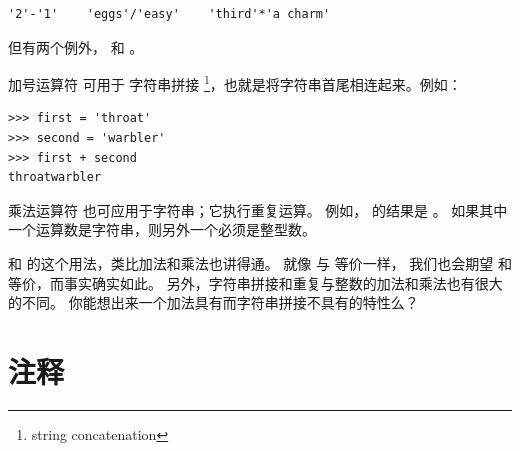 \begin{lstlisting}
'2'-'1'    'eggs'/'easy'    'third'*'a charm'
\end{lstlisting}

%

但有两个例外，\li{+} 和 \li{*}。

加号运算符 \li{+} 可用于 字符串拼接 \footnote{string concatenation}，也就是将字符串首尾相连起来。例如：

\begin{lstlisting}
>>> first = 'throat'
>>> second = 'warbler'
>>> first + second
throatwarbler
\end{lstlisting}

%

乘法运算符 \li{*} 也可应用于字符串；它执行重复运算。 例如， 的结果是 。  如果其中一个运算数是字符串，则另外一个必须是整型数。

\li{+} 和 \li{*} 的这个用法，类比加法和乘法也讲得通。 就像  与  等价一样， 我们也会期望  和  等价，而事实确实如此。 另外，字符串拼接和重复与整数的加法和乘法也有很大的不同。 你能想出来一个加法具有而字符串拼接不具有的特性么？

\section{注释}
  

